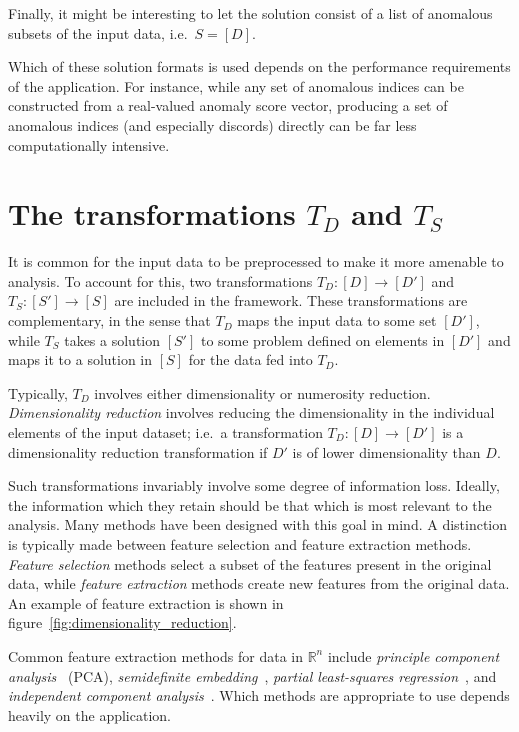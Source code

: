 Finally, it might be interesting to let the solution consist of a list of anomalous subsets of the input data, i.e.\ $S = [D]$.

Which of these solution formats is used depends on the performance requirements of the application. For instance, while any set of anomalous indices can be constructed from a real-valued anomaly score vector, producing a set of anomalous indices (and especially discords) directly can be far less computationally intensive.

\section{The transformations $T_D$ and $T_S$}

It is common for the input data to be preprocessed to make it more amenable to analysis. To account for this, two transformations $T_D: [D] \rightarrow [D']$ and $T_S: [S'] \rightarrow [S]$ are included in the framework. These transformations are complementary, in the sense that $T_D$ maps the input data to some set $[D']$, while $T_S$ takes a solution $[S']$ to some problem defined on elements in $[D']$ and maps it to a solution in $[S]$ for the data fed into $T_D$.

Typically, $T_D$ involves either dimensionality or numerosity reduction. \emph{Dimensionality reduction} involves reducing the dimensionality in the individual elements of the input dataset; i.e.\ a transformation $T_D: [D] \rightarrow [D']$ is a dimensionality reduction transformation if $D'$ is of lower dimensionality than $D$.

Such transformations invariably involve some degree of information loss. Ideally, the information which they retain should be that which is most relevant to the analysis. Many methods have been designed with this goal in mind. A distinction is typically made between feature selection and feature extraction methods. \emph{Feature selection} methods select a subset of the features present in the original data, while \emph{feature extraction} methods create new features from the original data. An example of feature extraction is shown in figure~\ref{fig:dimensionality_reduction}.

Common feature extraction methods for data in $\mathbb{R}^n$ include \emph{principle component analysis}~\cite{TODO} (PCA), \emph{semidefinite embedding}~\cite{TODO}, \emph{partial least-squares regression}~\cite{TODO}, and \emph{independent component analysis}~\cite{TODO}. Which methods are appropriate to use depends heavily on the application.

